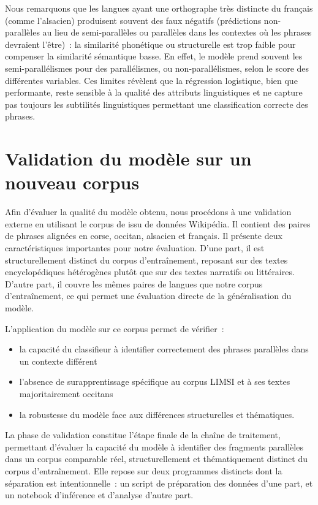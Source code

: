 Nous remarquons que les langues ayant une orthographe très distincte du français (comme l'alsacien) produisent
souvent des faux négatifs (prédictions non-parallèles au lieu de semi-parallèles ou parallèles dans les contextes où les phrases devraient l'être)~:
la similarité phonétique ou structurelle est trop faible pour compenser la
similarité sémantique basse. En effet, le modèle prend souvent les semi-parallélismes pour des parallélismes, ou
non-parallélismes, selon le score des différentes variables. Ces limites révèlent que la régression logistique, bien que performante, reste
sensible à la qualité des attributs linguistiques et ne capture pas toujours les subtilités linguistiques permettant une classification correcte
des phrases.

\section{Validation du modèle sur un nouveau corpus}

Afin d’évaluer la qualité du modèle obtenu, nous procédons à une validation externe en utilisant le corpus
de \citet{tsolakis_2024} issu de données Wikipédia. Il contient des paires de phrases alignées en corse, occitan,
alsacien et français. Il présente deux caractéristiques importantes pour notre évaluation. D'une part, il est
structurellement distinct du corpus d'entraînement, reposant sur des textes encyclopédiques hétérogènes
plutôt que sur des textes narratifs ou littéraires. D'autre part, il couvre les mêmes paires de langues que
notre corpus d'entraînement, ce qui permet une évaluation directe de la généralisation du modèle.

L’application du modèle sur ce corpus permet de vérifier~:
\begin{itemize}
    \item la capacité du classifieur à identifier correctement des phrases parallèles dans un contexte
    différent
    \item l’absence de surapprentissage spécifique au corpus LIMSI et à ses textes majoritairement occitans
    \item la robustesse du modèle face aux différences structurelles et thématiques.
\end{itemize}

La phase de validation constitue l'étape finale de la chaîne de traitement, permettant d'évaluer la capacité du modèle
à identifier des fragments parallèles dans un corpus comparable réel, structurellement et thématiquement
distinct du corpus d'entraînement. Elle repose sur deux programmes distincts dont la séparation est
intentionnelle~: un script de préparation des données d'une part, et un notebook d'inférence et d'analyse
d'autre part.

